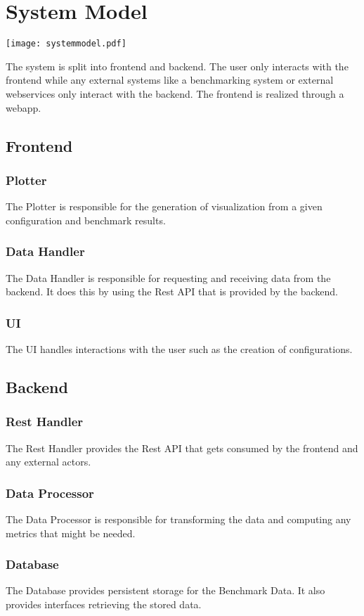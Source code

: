 \section{System Model}

\texttt{[image: systemmodel.pdf]}

The system is split into frontend and backend. The \gls{user} only interacts with the frontend while any external systems like a benchmarking system or external webservices only interact with the backend. The frontend is realized through a webapp.

\subsection{Frontend}

\subsubsection*{Plotter}

The Plotter is responsible for the generation of \gls{visualization} from a given \gls{configuration} and benchmark results. 

\subsubsection*{Data Handler}

The Data Handler is responsible for requesting and receiving data from the backend. It does this by using the Rest API that is provided by the backend.

\subsubsection*{UI}

The UI handles interactions with the \gls{user} such as the creation of \glspl{configuration}.

\subsection{Backend}

\subsubsection*{Rest Handler}

The Rest Handler provides the Rest API that gets consumed by the frontend and any external actors.

\subsubsection*{Data Processor}

The Data Processor is responsible for transforming the data and computing any metrics that might be needed.

\subsubsection*{Database}

The Database provides persistent storage for the Benchmark Data. It also provides interfaces retrieving the stored data.
